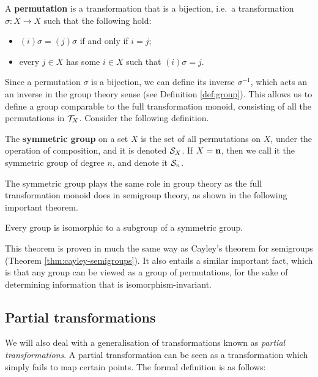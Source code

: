\begin{definition}
  \label{def:permutation}
  A \textbf{permutation} is a transformation that is a bijection, i.e.~a
  transformation $\sigma: X \to X$ such that the following hold:
  \begin{itemize}
  \item $(i)\sigma=(j)\sigma$ if and only if $i=j$;
  \item every $j \in X$ has some $i \in X$ such that $(i)\sigma = j$.
  \end{itemize}
\end{definition}

Since a permutation $\sigma$ is a bijection, we can define its inverse
$\sigma^{-1}$, which acts an an inverse in the group theory sense (see
Definition \ref{def:group}).  This allows us to define a group comparable to the
full transformation monoid, consisting of all the permutations in $\mathcal{T}_X$.
Consider the following definition.

\begin{definition}
  \label{def:sn}
  The \textbf{symmetric group} on a set $X$ is the set of all permutations on
  $X$, under the operation of composition, and it is denoted $\mathcal{S}_X$.  If
  $X = \mathbf{n}$, then we call it the symmetric group of degree $n$, and denote it
  $\mathcal{S}_n$.
\end{definition}

The symmetric group plays the same role in group theory as the full
transformation monoid does in semigroup theory, as shown in the following
important theorem.

\begin{theorem}
  \label{thm:cayley-groups}
  Every group is isomorphic to a subgroup of a symmetric group.
\end{theorem}

This theorem is proven in much the same way as Cayley's theorem for semigroups
(Theorem \ref{thm:cayley-semigroups}).  It also entails a similar important
fact, which is that any group can be viewed as a group of permutations, for the
sake of determining information that is isomorphism-invariant.

\subsection{Partial transformations}
\label{sec:partial-transformations}

We will also deal with a generalisation of transformations known as
\textit{partial transformations}.  A partial transformation can be seen as a
transformation which simply fails to map certain points.  The formal definition
is as follows:


